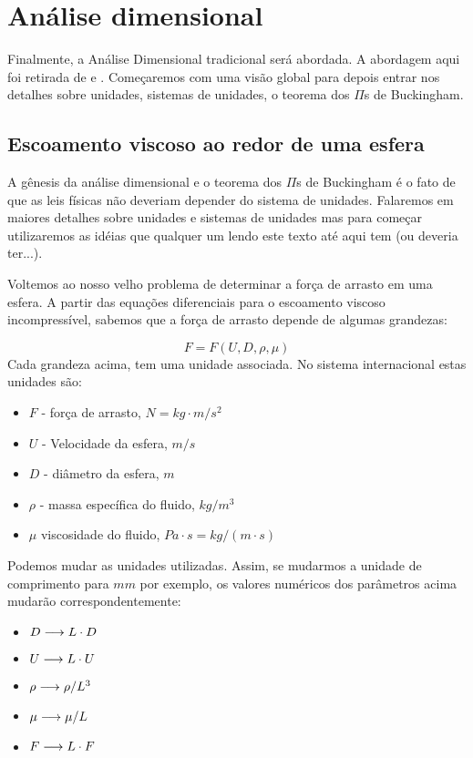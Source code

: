 \chapter{Análise dimensional}
\label{sec:adim}

Finalmente, a Análise Dimensional tradicional será abordada. A abordagem aqui foi retirada de  e . Começaremos com  uma visão global para depois entrar nos detalhes sobre unidades, sistemas de unidades, o teorema dos $\Pi$s de Buckingham.

\section{Escoamento viscoso ao redor de uma esfera}

A gênesis da análise dimensional e o teorema dos $\Pi$s de Buckingham é o fato de que as leis físicas não deveriam depender do sistema de unidades. Falaremos em maiores detalhes sobre unidades e sistemas de unidades mas para começar utilizaremos as idéias que qualquer um lendo este texto até aqui tem (ou deveria ter...).

Voltemos ao nosso velho problema de determinar a força de arrasto em uma esfera. A partir das equações diferenciais para o escoamento viscoso incompressível, sabemos que a força de arrasto depende de algumas grandezas:

\[
F = F(U, D, \rho, \mu)
\]
Cada grandeza acima, tem uma unidade associada. No sistema internacional estas unidades são:

\begin{itemize}
\item $F$ - força de arrasto, $N=kg\cdot m/s^2$
\item $U$ - Velocidade da esfera, $m/s$
\item $D$ - diâmetro da esfera, $m$
\item $\rho$ - massa específica do fluido, $kg/m^3$
\item $\mu$ viscosidade do fluido, $Pa\cdot s = kg/(m\cdot s)$
\end{itemize}

Podemos mudar as unidades utilizadas. Assim, se mudarmos a unidade de comprimento para $mm$ por exemplo, os valores numéricos dos parâmetros acima mudarão correspondentemente:

\begin{itemize}
\item $D \longrightarrow L \cdot D$
\item $U \longrightarrow L \cdot U$
\item $\rho \longrightarrow  \rho / L^3$
\item $\mu \longrightarrow \mu / L$
\item $F \longrightarrow L \cdot F$
\end{itemize}

